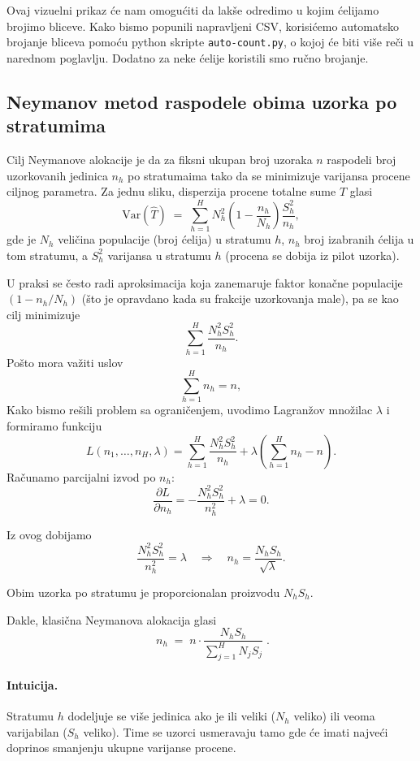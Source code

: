 \documentclass[a4paper,12pt]{article}
\begin{document}
\noindent
Ovaj vizuelni prikaz će nam omogućiti da lakše odredimo u kojim ćelijamo brojimo bliceve. 
Kako bismo popunili napravljeni CSV, korisićemo automatsko brojanje bliceva pomoću python skripte \texttt{auto-count.py}, o kojoj će biti više
reči u narednom poglavlju. Dodatno za neke ćelije koristili smo ručno brojanje.

\subsection{Neymanov metod raspodele obima uzorka po stratumima}
\noindent

Cilj Neymanove alokacije je da za fiksni ukupan broj uzoraka $n$ raspodeli broj uzorkovanih jedinica $n_h$ po stratumaima tako da se minimizuje varijansa procene ciljnog parametra.  
Za jednu sliku, disperzija procene totalne sume $\hat T$ glasi
\[
\mathrm{Var}(\hat T) \;=\; \sum_{h=1}^H N_h^2 \left(1-\frac{n_h}{N_h}\right)\frac{S_h^2}{n_h},
\]
gde je $N_h$ veličina populacije (broj ćelija) u stratumu $h$, $n_h$ broj izabranih ćelija u tom stratumu, a $S_h^2$ varijansa u stratumu $h$ (procena se dobija iz pilot uzorka).  

U praksi se često radi aproksimacija koja zanemaruje faktor konačne populacije $(1 - n_h/N_h)$ (što je opravdano kada su frakcije uzorkovanja male), pa se kao cilj minimizuje
\[
\sum_{h=1}^H \frac{N_h^2 S_h^2}{n_h}.
\]
Pošto mora važiti uslov
\[
\sum_{h=1}^H n_h = n,
\]
Kako bismo rešili problem sa ograničenjem, uvodimo Lagranžov množilac $\lambda$ i formiramo funkciju
\[
L(n_1, \dots, n_H, \lambda) = \sum_{h=1}^H \frac{N_h^2 S_h^2}{n_h} 
+ \lambda \left( \sum_{h=1}^H n_h - n \right).
\]
Računamo parcijalni izvod po $n_h$:
\[
\frac{\partial L}{\partial n_h} = -\frac{N_h^2 S_h^2}{n_h^2} + \lambda = 0.
\]

Iz ovog dobijamo
\[
\frac{N_h^2 S_h^2}{n_h^2} = \lambda
\quad \Rightarrow \quad
n_h = \frac{N_h S_h}{\sqrt{\lambda}}.
\]

Obim uzorka po stratumu je proporcionalan proizvodu $N_h S_h$.


Dakle, klasična Neymanova alokacija glasi
\[
\boxed{ \; n_h \;=\; n \cdot \frac{N_h S_h}{\sum_{j=1}^H N_j S_j} \; }.
\]

\paragraph{Intuicija.} Stratumu $h$ dodeljuje se više jedinica ako je ili veliki ($N_h$ veliko) ili veoma varijabilan ($S_h$ veliko). Time se uzorci usmeravaju tamo gde će imati najveći doprinos smanjenju ukupne varijanse procene.
\end{document}
